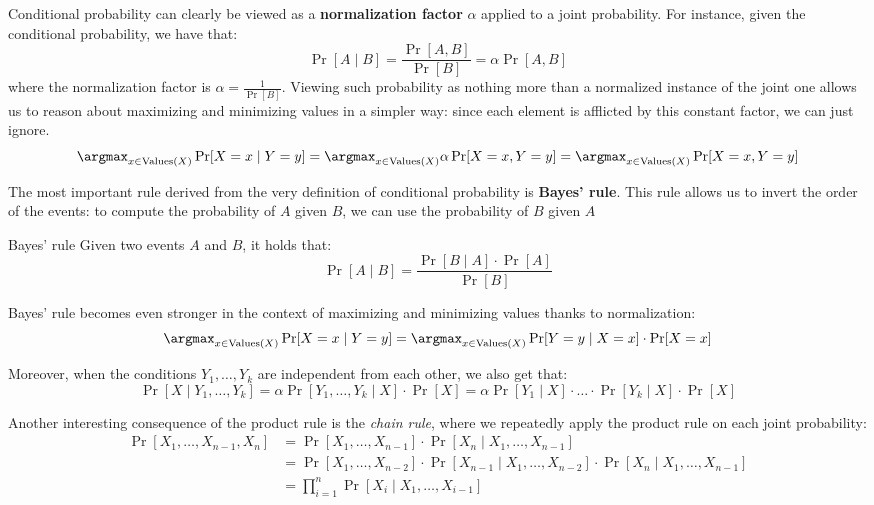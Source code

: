 \documentclass[a4paper, 12pt]{report}
\begin{document}
    Conditional probability can clearly be viewed as a \textbf{normalization factor} $\alpha$ applied to a joint probability. For instance, given the conditional probability, we have that:
    \[\Pr[A \mid B] = \frac{\Pr[A , B]}{\Pr[B]} = \alpha \Pr[A , B]\]
    where the normalization factor is $\alpha = \frac{1}{\Pr[B]}$. Viewing such probability as nothing more than a normalized instance of the joint one allows us to reason about maximizing and minimizing values in a simpler way: since each element is afflicted by this constant factor, we can just ignore. 
    \[\argmax_{x \in \mathrm{Values}(X)} \Pr[X = x \mid Y = y] = \argmax_{x \in \mathrm{Values}(X)} \alpha \Pr[X = x , Y = y] = \argmax_{x \in \mathrm{Values}(X)} \Pr[X = x, Y = y]\]

    The most important rule derived from the very definition of conditional probability is \textbf{Bayes' rule}. This rule allows us to invert the order of the events: to compute the probability of $A$ given $B$, we can use the probability of $B$ given $A$

    \begin{framedprop}{Bayes' rule}
        Given two events $A$ and $B$, it holds that:
        \[\Pr[A \mid B] = \frac{\Pr[B \mid A] \cdot \Pr[A]}{\Pr[B]}\]
    \end{framedprop}

    Bayes' rule becomes even stronger in the context of maximizing and minimizing values thanks to normalization:
    \[\argmax_{x \in \mathrm{Values}(X)} \Pr[X = x \mid Y = y] = \argmax_{x \in \mathrm{Values}(X)} \Pr[Y = y \mid X = x] \cdot \Pr[X = x]\]
    
    Moreover, when the conditions $Y_1, \ldots, Y_k$ are independent from each other, we also get that:
    \[\Pr[X \mid Y_1, \ldots, Y_k] = \alpha \Pr[Y_1, \ldots, Y_k \mid X] \cdot \Pr[X] = \alpha \Pr[Y_1 \mid X] \cdot \ldots \cdot \Pr[Y_k \mid X] \cdot \Pr[X]\]

    Another interesting consequence of the product rule is the \textit{chain rule}, where we repeatedly apply the product rule on each joint probability:
    \[\begin{split}
        \Pr[X_1, \ldots, X_{n-1}, X_n] & = \Pr[X_1, \ldots, X_{n-1}] \cdot \Pr[X_n \mid X_1, \ldots, X_{n-1}] \\
        & = \Pr[X_1, \ldots, X_{n-2}] \cdot \Pr[X_{n-1} \mid X_1, \ldots, X_{n-2}] \cdot \Pr[X_n \mid X_1, \ldots, X_{n-1}] \\
        &= \prod_{i = 1}^n \Pr[X_i \mid X_1, \ldots, X_{i-1}]
    \end{split}\]
\end{document}
